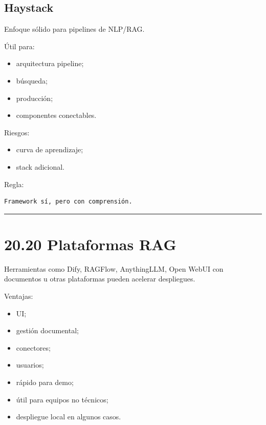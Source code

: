 \subsection{Haystack}\label{haystack}

Enfoque sólido para pipelines de NLP/RAG.

Útil para:

\begin{itemize}
\tightlist
\item
  arquitectura pipeline;
\item
  búsqueda;
\item
  producción;
\item
  componentes conectables.
\end{itemize}

Riesgos:

\begin{itemize}
\tightlist
\item
  curva de aprendizaje;
\item
  stack adicional.
\end{itemize}

Regla:

\begin{lstlisting}
Framework sí, pero con comprensión.
\end{lstlisting}

\begin{center}\rule{0.5\linewidth}{0.5pt}\end{center}

\section{20.20 Plataformas RAG}\label{plataformas-rag}

Herramientas como Dify, RAGFlow, AnythingLLM, Open WebUI con documentos
u otras plataformas pueden acelerar despliegues.

Ventajas:

\begin{itemize}
\tightlist
\item
  UI;
\item
  gestión documental;
\item
  conectores;
\item
  usuarios;
\item
  rápido para demo;
\item
  útil para equipos no técnicos;
\item
  despliegue local en algunos casos.
\end{itemize}

